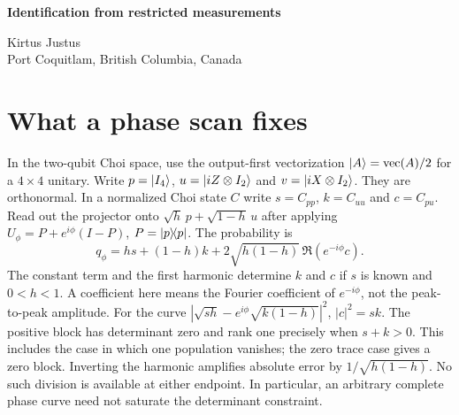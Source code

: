 \documentclass[11pt,letterpaper]{article}
\begin{document}
\thispagestyle{plain}
\begin{center}{\LARGE\sffamily\bfseries\color{ink}Identification from restricted measurements}\par\medskip
{\large Kirtus Justus}\\Port Coquitlam, British Columbia, Canada\end{center}
\begin{abstract}
An experiment may identify a sharp interval even when it cannot identify a unique operation. We derive this interval for rectangular quantum operations with any finite discarded factor of dimension at least two. A joint semidefinite program gives the attainable ceiling, and regular-simplex states show why separately optimizing the pairs can overestimate it. Observing returned labels yields two-sided bounds, with a polygon formula for commuting data. Even full basis-output tomography can leave a finite interval. Calibrated coherent return measurements determine the weight by an average-fidelity identity. A single graph edge distinguishes relative precision from uniform absolute precision. For a specified graph pair, we compute the loss in total variation when a resolved eigenvalue is passed through the scale filter. A rare-success discrimination problem separates an assignment-independent lower bound, a bound that uses the allocation policy, and an attainable minimum for two specified laws. All trial probabilities in these examples are model values.
\end{abstract}

\section{What a phase scan fixes}
In the two-qubit Choi space, use the output-first vectorization $\lvert A\rangle=\operatorname{vec}(A)/2$ for a $4\times4$ unitary. Write $p=\lvert I_4\rangle$, $u=\lvert iZ\otimes I_2\rangle$ and $v=\lvert iX\otimes I_2\rangle$. They are orthonormal. In a normalized Choi state $C$ write $s=C_{pp}$, $k=C_{uu}$ and $c=C_{pu}$. Read out the projector onto $\sqrt h\,p+\sqrt{1-h}\,u$ after applying $U_\phi=P+e^{i\phi}(I-P)$, $P=\lvert p\rangle\!\langle p\rvert$. The probability is
\[
 q_\phi=hs+(1-h)k+2\sqrt{h(1-h)}\,\Re(e^{-i\phi}c).
\]
The constant term and the first harmonic determine $k$ and $c$ if $s$ is known and $0<h<1$. A coefficient here means the Fourier coefficient of $e^{-i\phi}$, not the peak-to-peak amplitude. For the curve $|\sqrt{sh}-e^{i\phi}\sqrt{k(1-h)}|^2$, $|c|^2=sk$. The positive block has determinant zero and rank one precisely when $s+k>0$. This includes the case in which one population vanishes; the zero trace case gives a zero block. Inverting the harmonic amplifies absolute error by $1/\sqrt{h(1-h)}$. No such division is available at either endpoint. In particular, an arbitrary complete phase curve need not saturate the determinant constraint.
\end{document}
